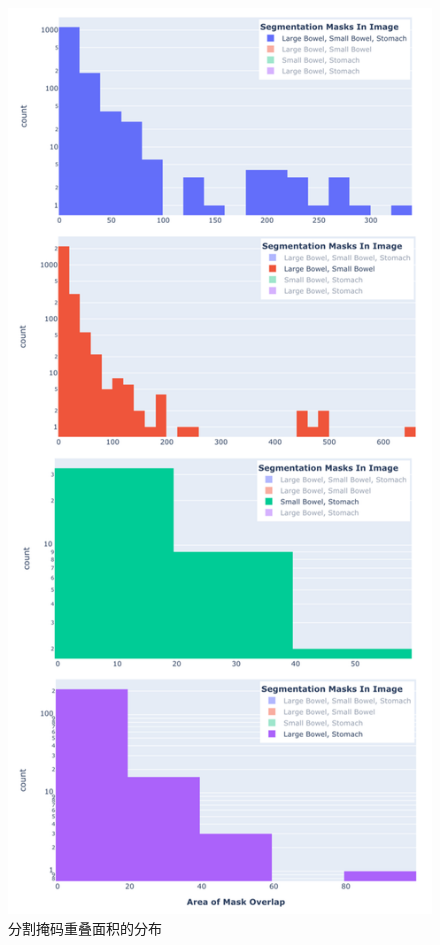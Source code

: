 \documentclass[letterpaper, 10pt, conference, twoside]{ieeeconf}
\begin{document}
\begin{figure}[htbp]
  \centering
  \includegraphics[width = 1\linewidth]{seg_overlay_distribution.png}
  \caption{分割掩码重叠面积的分布}
  \label{fig:fig6}
\end{figure}
\end{document}

